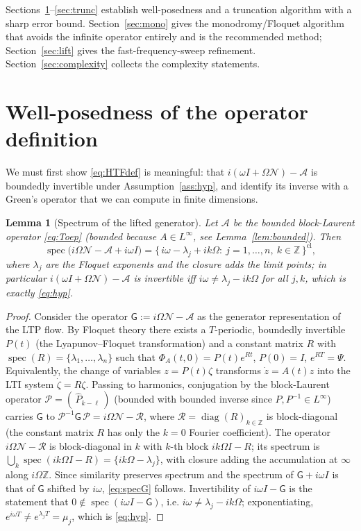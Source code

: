 \documentclass{amsart}
\newtheorem{lemma}{Lemma}
\theoremstyle{definition}
\DeclareMathOperator{\spec}{spec}
\DeclareMathOperator{\diag}{diag}
\newcommand{\Z}{\mathbb{Z}}
\newcommand{\Acal}{\mathcal{A}}
\newcommand{\Ncal}{\mathcal{N}}
\begin{document}
Sections~\ref{sec:wellposed}--\ref{sec:trunc} establish well-posedness and a
truncation algorithm with a sharp error bound. Section~\ref{sec:mono} gives the
monodromy/Floquet algorithm that avoids the infinite operator entirely and is
the recommended method; Section~\ref{sec:lift} gives the
fast-frequency-sweep refinement. Section~\ref{sec:complexity} collects the
complexity statements.

\section{Well-posedness of the operator definition}\label{sec:wellposed}

We must first show \eqref{eq:HTFdef} is meaningful: that
$i(\omega I+\Omega\Ncal)-\Acal$ is boundedly invertible under
Assumption~\ref{ass:hyp}, and identify its inverse with a Green's operator that
we can compute in finite dimensions.

\begin{lemma}[Spectrum of the lifted generator]\label{lem:spectrum}
Let $\Acal$ be the bounded block-Laurent operator \eqref{eq:Toep} (bounded
because $A\in L^\infty$, see Lemma~\ref{lem:bounded}). Then
\begin{equation}\label{eq:specG}
\spec\!\big(i\Omega\Ncal-\Acal+i\omega I\big)
=\big\{\,i\omega-\lambda_j+i k\Omega:\ j=1,\dots,n,\ k\in\Z\,\big\}^{\mathrm{cl}},
\end{equation}
where $\lambda_j$ are the Floquet exponents and the closure adds the limit
points; in particular $i(\omega I+\Omega\Ncal)-\Acal$ is invertible iff
$i\omega\ne\lambda_j-ik\Omega$ for all $j,k$, which is exactly \eqref{eq:hyp}.
\end{lemma}

\begin{proof}
Consider the operator $\mathsf G:=i\Omega\Ncal-\Acal$ as the generator
representation of the LTP flow. By Floquet theory there exists a $T$-periodic,
boundedly invertible $P(t)$ (the Lyapunov–Floquet transformation) and a
constant matrix $R$ with $\spec(R)=\{\lambda_1,\dots,\lambda_n\}$ such that
$\Phi_A(t,0)=P(t)e^{Rt}$, $P(0)=I$, $e^{RT}=\Psi$. Equivalently, the change of
variables $z=P(t)\zeta$ transforms $\dot z=A(t)z$ into the LTI system
$\dot\zeta=R\zeta$. Passing to harmonics, conjugation by the block-Laurent
operator $\mathcal P=(\,\hat P_{k-\ell}\,)$ (bounded with bounded inverse since
$P,P^{-1}\in L^\infty$) carries $\mathsf G$ to
$\mathcal P^{-1}\mathsf G\,\mathcal P=i\Omega\Ncal-\mathcal R$, where
$\mathcal R=\diag(R)_{k\in\Z}$ is block-diagonal (the constant matrix $R$ has
only the $k=0$ Fourier coefficient). The operator $i\Omega\Ncal-\mathcal R$ is
block-diagonal in $k$ with $k$-th block $ik\Omega I-R$; its spectrum is
$\bigcup_k\spec(ik\Omega I-R)=\{ik\Omega-\lambda_j\}$, with closure adding the
accumulation at $\infty$ along $i\Omega\Z$. Since similarity preserves spectrum
and the spectrum of $\mathsf G+i\omega I$ is that of $\mathsf G$ shifted by
$i\omega$, \eqref{eq:specG} follows. Invertibility of
$i\omega I-\mathsf G$ is the statement that $0\notin\spec(i\omega I-\mathsf G)$,
i.e. $i\omega\ne\lambda_j-ik\Omega$; exponentiating, $e^{i\omega T}\ne
e^{\lambda_j T}=\mu_j$, which is \eqref{eq:hyp}.
\end{proof}
\end{document}
